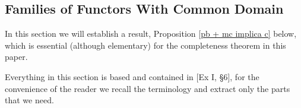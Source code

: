 \begin{comment}
\begin{remark}\label{monic conservative implica conservative}
If $\cc{C}$ is regular and $\cc{F}$  the set of all regular functors $\cc{C} \mr{} \cc{E}ns$ is monic conservative, it follows that it is conservative and faithful.
\end{remark}


\begin{remark}
Even under the strictest limit-preserving conditions we will not be able to guarantee that a faithful family is conservative in any sense. Take the following counterexample: Let $\cc{C}=\{0 \mr{u} 1\}$ and take the family whose only member is the functor $\cc{C} \mr{F} \{*\}$. $\cc{C}$ is a regular category that in fact  has all limits and colimits, $F$ is regular and preserves all limits and colimits , $F$ is faithful but nevertheless does not reflect the isomorphism $Fu$.
\end{remark}
 
\begin{proposition}
If in $\cc{C}$ every bimorphism (a morphism that is both epic and monic) is an isomorphism and $\cc{F}$ is faithful, then $\cc{F}$ is conservative.
\end{proposition}
\end{comment}

%

\subsection{Families of Functors With Common Domain} \label{families}


In this section we will establish a result, Proposition 
\ref{pb + mc implica c} below, which is essential (although elementary) for the completeness theorem in this paper.

\vspace{1ex}


Everything in this section is based and contained in 
\cite{sga4}[Ex I, \S 6], for the convenience of the reader we recall the terminology and extract only the parts that we need.

